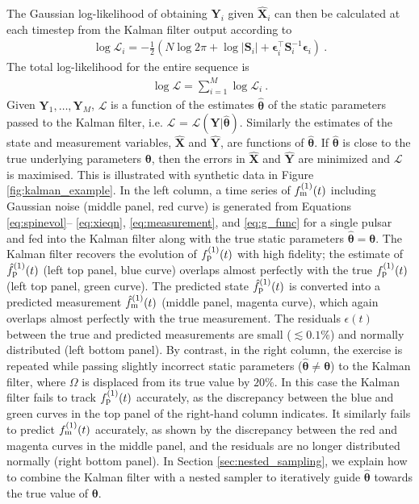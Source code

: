 \documentclass[fleqn,usenatbib,useAMS]{mnras}
\begin{document}
The Gaussian log-likelihood of obtaining ${\boldsymbol{Y}}_i$ given ${\boldsymbol{\hat X}}_i$ can  then be calculated at each timestep from the Kalman filter output according to
\begin{eqnarray}
	\log \mathcal{L}_i =  -\frac{1}{2} \left (N \log 2 \pi + \log  \left | \boldsymbol{S}_i \right | + \boldsymbol{\epsilon}_i^{\intercal} \boldsymbol{S}_i^{-1}  \boldsymbol{\epsilon}_i \right ) \ .
\end{eqnarray}
The total log-likelihood for the entire sequence is
\begin{eqnarray}
	\log \mathcal{L} =  \sum_{i=1}^{M} \log \mathcal{L}_i \ . \label{eq:likelihood}
\end{eqnarray}
Given ${\boldsymbol{Y}}_1, \dots, {\boldsymbol{Y}}_M$, $\mathcal{L}$ is a function of the estimates ${\boldsymbol{\hat \theta}}$ of the static parameters passed to the Kalman filter, i.e. $\mathcal{L}$ = $\mathcal{L}(\boldsymbol{Y} | \boldsymbol{\hat \theta})$. Similarly the estimates of the state and measurement variables, $\hat{\boldsymbol{X}}$ and $\hat{\boldsymbol{Y}}$, are functions of $\boldsymbol{\hat \theta}$. If $\boldsymbol{\hat{\theta}}$ is close to the true underlying parameters $\boldsymbol{\theta}$, then the errors in $\hat{\boldsymbol{X}}$ and $\hat{\boldsymbol{Y}}$ are minimized and $\mathcal{L}$ is maximised. This is illustrated with synthetic data in Figure \ref{fig:kalman_example}. In the left column, a time series of $f_{\rm m}^{(1)}(t)$ including Gaussian noise (middle panel, red curve) is generated from Equations \eqref{eq:spinevol}-- \eqref{eq:xieqn}, \eqref{eq:measurement}, and \eqref{eq:g_func} for a single pulsar and fed into the Kalman filter along with the true static parameters ${\boldsymbol{\hat \theta}} = {\boldsymbol{\theta}}$. The Kalman filter recovers the evolution of $f_{\rm p}^{(1)}(t)$ with high fidelity; the estimate of $\hat{f}_{\rm p}^{(1)}(t)$ (left top panel, blue curve) overlaps almost perfectly with the true $f_{\rm p}^{(1)}(t)$ (left top panel, green curve). The predicted state $\hat{f}_{\rm p}^{(1)}(t)$ is converted  into a predicted measurement $\hat{f}_{\rm m}^{(1)}(t)$ (middle panel, magenta curve), which again overlaps almost perfectly with the true measurement. The residuals $\epsilon(t)$ between the true and predicted measurements are small ($\lesssim 0.1\%$) and normally distributed (left bottom panel). By contrast, in the right column, the exercise is repeated while passing slightly incorrect static parameters (${\boldsymbol{\hat\theta}} \neq {\boldsymbol{\theta}}$) to the Kalman filter, where $\Omega$ is displaced from its true value by $20 \%$. In this case the Kalman filter fails to track $f_{\rm p}^{(1)}(t)$ accurately, as the discrepancy between the blue and green curves in the top panel of the right-hand column indicates. It similarly fails to predict $f_{\rm m}^{(1)}(t)$ accurately, as shown by the discrepancy between the red and magenta curves in the middle panel, and the residuals are no longer distributed normally (right bottom panel). In Section \ref{sec:nested_sampling}, we explain how to combine the Kalman filter with a nested sampler to iteratively guide ${\boldsymbol{\hat \theta}}$ towards the true value of ${\boldsymbol{\theta}}$. 
\end{document}
